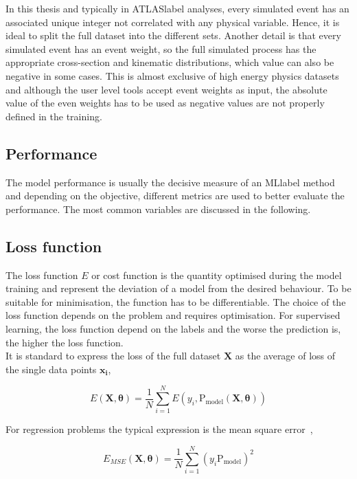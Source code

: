 In this thesis and typically in \acrshort{ATLASlabel} analyses, every simulated event has an associated unique integer not correlated with any physical variable. Hence, it is ideal to split the full dataset into the different sets. Another detail is that every simulated event has an event weight, so the full simulated process has the appropriate cross-section and kinematic distributions, which value can also be negative in some cases. This is almost exclusive of high energy physics datasets and although the user level tools accept event weights as input, the absolute value of the even weights has to be used as negative values are not properly defined in the training. 

\subsection{Performance}

The model performance is usually the decisive measure of an \acrshort{MLlabel} method and depending on the objective, different metrics are used to better evaluate the performance. The most common variables are discussed in the following.

\subsection{Loss function}

The loss function $E$ or cost function is the quantity optimised during the model training and represent the deviation of a model from the desired behaviour. To be suitable for minimisation, the function has to be differentiable. The choice of the loss function depends on the problem and requires optimisation. For supervised learning, the loss function depend on the labels and the worse the prediction is, the higher the loss function.\\

It is standard to express the loss of the full dataset $\mathbf{X}$ as the average of loss of the single data points $\mathbf{x_i}$,

\begin{equation}
    E(\mathbf{X},\boldsymbol{\theta})=\frac{1}{N}\sum_{i=1}^NE(y_i,\text{P}_\text{model}(\mathbf{X},\boldsymbol{\theta}))
\end{equation}

For regression problems the typical expression is the mean square error~\cite{EncyclopediaofML}, 

\begin{equation}
    E_{MSE}(\mathbf{X},\boldsymbol{\theta}) = \frac{1}{N}\sum_{i=1}^N (y_i\text{P}_\text{model})^2
\end{equation}

